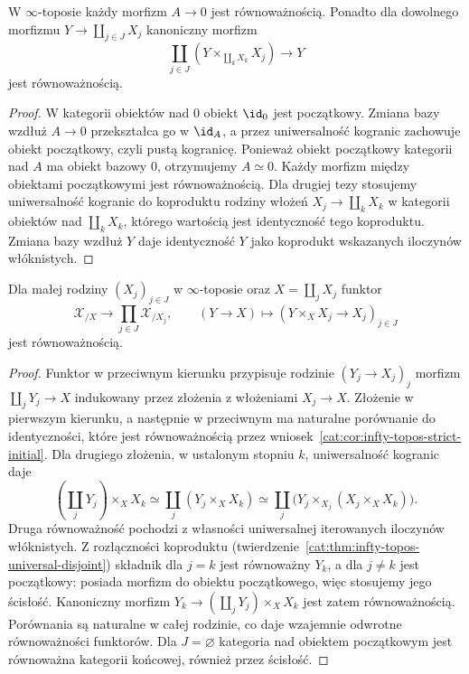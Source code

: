 \begin{wniosek}\label{cat:cor:infty-topos-strict-initial}
W $\infty$-toposie każdy morfizm $A\to0$ jest równoważnością. Ponadto dla dowolnego morfizmu $Y\to\coprod_{j\in J}X_j$ kanoniczny morfizm
\[
 \coprod_{j\in J}(Y\times_{\coprod_kX_k}X_j)\longrightarrow Y
\]
jest równoważnością.
\end{wniosek}
\begin{proof}
W kategorii obiektów nad $0$ obiekt $\id_0$ jest początkowy. Zmiana bazy wzdłuż $A\to0$ przekształca go w $\id_A$, a przez uniwersalność kogranic zachowuje obiekt początkowy, czyli pustą kogranicę. Ponieważ obiekt początkowy kategorii nad $A$ ma obiekt bazowy $0$, otrzymujemy $A\simeq0$. Każdy morfizm między obiektami początkowymi jest równoważnością. Dla drugiej tezy stosujemy uniwersalność kogranic do koproduktu rodziny włożeń $X_j\to\coprod_kX_k$ w kategorii obiektów nad $\coprod_kX_k$, którego wartością jest identyczność tego koproduktu. Zmiana bazy wzdłuż $Y$ daje identyczność $Y$ jako koprodukt wskazanych iloczynów włóknistych.
\end{proof}

\begin{wniosek}\label{cat:cor:infty-topos-extensive-slices}
Dla małej rodziny $(X_j)_{j\in J}$ w $\infty$-toposie oraz $X=\coprod_jX_j$ funktor
\[
 \mathcal X_{/X}\longrightarrow\prod_{j\in J}\mathcal X_{/X_j},
 \qquad (Y\to X)\longmapsto(Y\times_X X_j\to X_j)_{j\in J}
\]
jest równoważnością.
\end{wniosek}
\begin{proof}
Funktor w przeciwnym kierunku przypisuje rodzinie $(Y_j\to X_j)_j$ morfizm $\coprod_jY_j\to X$ indukowany przez złożenia z włożeniami $X_j\to X$. Złożenie w pierwszym kierunku, a następnie w przeciwnym ma naturalne porównanie do identyczności, które jest równoważnością przez wniosek~\ref{cat:cor:infty-topos-strict-initial}. Dla drugiego złożenia, w ustalonym stopniu $k$, uniwersalność kogranic daje
\[
 (\coprod_jY_j)\times_X X_k
 \simeq\coprod_j(Y_j\times_X X_k)
 \simeq\coprod_j\bigl(Y_j\times_{X_j}(X_j\times_X X_k)\bigr).
\]
Druga równoważność pochodzi z własności uniwersalnej iterowanych iloczynów włóknistych. Z rozłączności koproduktu (twierdzenie~\ref{cat:thm:infty-topos-universal-disjoint}) składnik dla $j=k$ jest równoważny $Y_k$, a dla $j\neq k$ jest początkowy: posiada morfizm do obiektu początkowego, więc stosujemy jego ścisłość. Kanoniczny morfizm $Y_k\to(\coprod_jY_j)\times_X X_k$ jest zatem równoważnością. Porównania są naturalne w całej rodzinie, co daje wzajemnie odwrotne równoważności funktorów. Dla $J=\varnothing$ kategoria nad obiektem początkowym jest równoważna kategorii końcowej, również przez ścisłość.
\end{proof}

